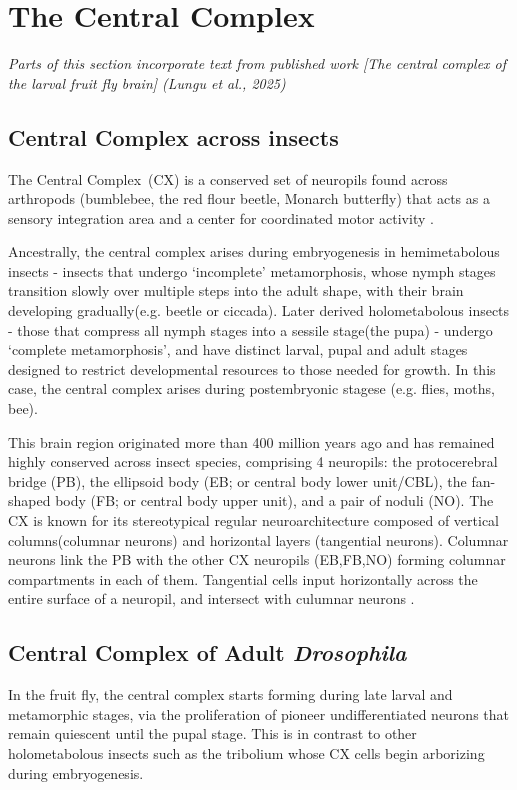 \section{The Central Complex}
\textit{Parts of this section incorporate text from published work [The central complex of the larval fruit fly brain] (Lungu et al., 2025)}

    \subsection{Central Complex across insects}
    
        The Central Complex~(CX) is a conserved set of neuropils found across arthropods (bumblebee, the red flour beetle, Monarch butterfly) that acts as a sensory integration area and a center for coordinated motor activity \citep{PfeifferHomberg2014, turnerevans2016CX, heinze2024variations}.

        Ancestrally, the central complex arises during embryogenesis in hemimetabolous insects - insects that undergo ‘incomplete’ metamorphosis, whose nymph stages transition slowly over multiple steps into the adult shape, with their brain developing gradually(e.g. beetle or ciccada).
        Later derived holometabolous insects - those that compress all nymph stages into a sessile stage(the pupa) -  undergo ‘complete metamorphosis’, and have distinct larval, pupal and adult stages designed to restrict developmental resources to those needed for growth. In this case, the central complex arises during  postembryonic stagese (e.g. flies, moths, bee).

        This brain region originated more than 400 million years ago and has remained highly conserved across insect species, comprising 4 neuropils: the protocerebral bridge (PB), the ellipsoid body (EB; or central body lower unit/CBL), the fan-shaped body (FB; or central body upper unit), and a pair of noduli (NO). The CX is known for its stereotypical regular neuroarchitecture composed of vertical columns(columnar neurons) and horizontal layers (tangential neurons). Columnar neurons link the PB with the other CX neuropils (EB,FB,NO) forming columnar compartments in each of them. Tangential cells input horizontally across the entire surface of a neuropil, and intersect with culumnar neurons \citep{honkanen2019insect}. 


    \subsection{Central Complex of Adult \textit{Drosophila}}
        In the fruit fly, the central complex starts forming during late larval and metamorphic stages, via the proliferation of pioneer undifferentiated neurons that remain quiescent until the pupal stage. This is in contrast to other holometabolous insects such as the tribolium \citep{farnworth2022atlas} whose CX cells begin arborizing during embryogenesis.

